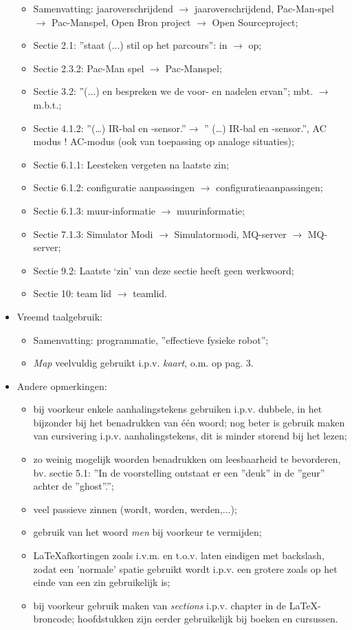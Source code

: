 \documentclass[12pt,a4paper]{report}
\begin{document}
\begin{itemize}
\begin{itemize}
	\item Samenvatting: jaaroverschrijdend $\rightarrow$ jaaroverschrijdend, Pac-Man-spel$\rightarrow$ Pac-Manspel, Open Bron project $\rightarrow$ Open Sourceproject;
	\item Sectie 2.1: ''staat (...) stil op het parcours'': in $\rightarrow$ op;
	\item Sectie 2.3.2: Pac-Man spel $\rightarrow$ Pac-Manspel;
	\item Sectie 3.2: ''(...) en bespreken we de voor- en nadelen ervan''; mbt. $\rightarrow$ m.b.t.;
	\item Sectie 4.1.2: ''(\ldots) IR-bal en -sensor.''$\rightarrow$  '' (\ldots) IR-bal en -sensor.'', AC modus ! AC-modus (ook van
toepassing op analoge situaties);
	\item Sectie 6.1.1: Leesteken vergeten na laatste zin;
	\item Sectie 6.1.2: configuratie aanpassingen $\rightarrow$ configuratieaanpassingen;
	\item Sectie 6.1.3: muur-informatie $\rightarrow$ muurinformatie;
	\item Sectie 7.1.3: Simulator Modi $\rightarrow$ Simulatormodi, MQ-server $\rightarrow$ MQ-server;
	\item Sectie 9.2: Laatste `zin' van deze sectie heeft geen werkwoord;
	\item Sectie 10: team lid $\rightarrow$ teamlid.
\end{itemize}
	\item Vreemd taalgebruik:
  \begin{itemize}
	\item Samenvatting: programmatie, ''effectieve fysieke robot'';
	\item \textit{Map} veelvuldig gebruikt i.p.v. \textit{kaart}, o.m. op pag. 3.
\end{itemize}
	\item Andere opmerkingen:
\begin{itemize}
	\item bij voorkeur enkele aanhalingstekens gebruiken i.p.v. dubbele, in het bijzonder bij het benadrukken van \'e\'en
woord; nog beter is gebruik maken van cursivering i.p.v. aanhalingstekens, dit is minder storend bij het
lezen;
	\item zo weinig mogelijk woorden benadrukken om leesbaarheid te bevorderen, bv. sectie 5.1: ''In de voorstelling ontstaat er een ''deuk'' in de ''geur'' achter de ''ghost''.'';
	\item veel passieve zinnen (wordt, worden, werden,...);
	\item gebruik van het woord \textit{men} bij voorkeur te vermijden;
	\item \LaTeX afkortingen zoals i.v.m. en t.o.v. laten eindigen met backslash, zodat een 'normale' spatie gebruikt
wordt i.p.v. een grotere zoals op het einde van een zin gebruikelijk is;
	\item bij voorkeur gebruik maken van \textit{sections} i.p.v. chapter in de \LaTeX-broncode; hoofdstukken zijn eerder gebruikelijk bij boeken en cursussen.
\end{itemize}
\end{itemize}
\end{document}
